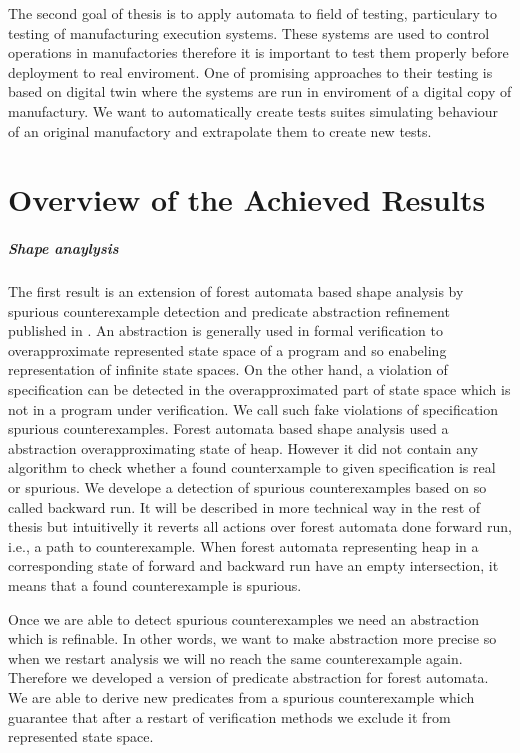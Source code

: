 The second goal of thesis is to apply automata to field of testing, particulary
to testing of manufacturing execution systems.
These systems are used to control operations in manufactories therefore it is
important to test them properly before deployment to real enviroment.
One of promising approaches to their testing is based on digital twin where
the systems are run in enviroment of a digital copy of manufactury.
We want to automatically create tests suites simulating behaviour of an original
manufactory and extrapolate them to create new tests.

\section{Overview of the Achieved Results}
\subparagraph{Shape anaylysis}
The first result is an extension of forest automata based shape analysis by
spurious counterexample detection and predicate abstraction refinement published in \cite{vmcai17}.
An abstraction is generally used in formal verification to overapproximate
represented state space of a program and so enabeling representation of infinite
state spaces.
On the other hand, a violation of specification can be detected in the overapproximated
part of state space which is not in a program under verification.
We call such fake violations of specification spurious counterexamples.
Forest automata based shape analysis used a abstraction overapproximating
state of heap.
However it did not contain any algorithm to check whether a found counterxample
to given specification is real or spurious.
We develope a detection of spurious counterexamples based on so called backward run.
It will be described in more technical way in the rest of thesis but intuitivelly it
reverts all actions over forest automata done forward run, i.e., a path to counterexample.
When forest automata representing heap in a corresponding state of forward and
backward run have an empty intersection, it means that a found counterexample is spurious.

Once we are able to detect spurious counterexamples we need an abstraction which is refinable. 
In other words, we want to make abstraction more precise so when we restart analysis
we will no reach the same counterexample again.
Therefore we developed a version of predicate abstraction for forest automata.
We are able to derive new predicates from a spurious counterexample which
guarantee that after a restart of verification methods we exclude it
from represented state space.

